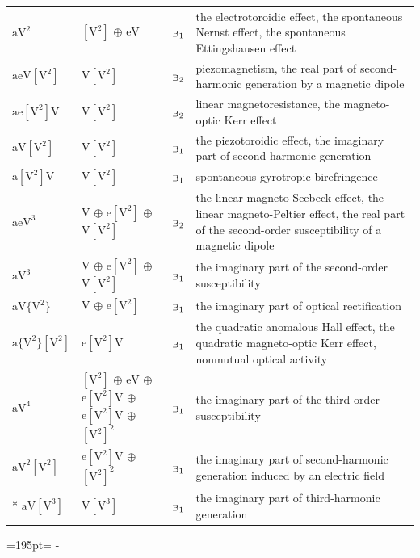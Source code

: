 \documentclass[10pt,a4paper]{article}
\newcommand{\needspace}[1]{\par\penalty-100\begingroup\dimen0=#1\relax\dimen2=\pagegoal
  \advance\dimen2-\pagetotal\ifdim\dimen0>\dimen2\relax\ifdim\dimen2>0pt\vfil\break\fi\fi
  \endgroup}
\numberwithin{equation}{section}
\newcommand{\irr}[1]{\text{\normalfont\scshape #1}}
\newcommand{\jahn}[1]{\mathrm{#1}}
\newlength{\fillwidth}\newlength{\cellwidth}\newlength{\colwidth}
\begin{document}
{\begin{longtable}{@{}lll>{\RaggedRight\arraybackslash}p{\fillwidth}@{}}
$\jahn{aV^{2}}$ & $\jahn{[V^{2}]}$ $\oplus$ $\jahn{eV}$ & $\irr{b}_{1}$ & the electrotoroidic effect, the spontaneous Nernst effect, the spontaneous Ettingshausen effect\\
$\jahn{aeV[V^{2}]}$ & $\jahn{V[V^{2}]}$ & $\irr{b}_{2}$ & piezomagnetism, the real part of second-harmonic generation by a magnetic dipole\\
$\jahn{ae[V^{2}]V}$ & $\jahn{V[V^{2}]}$ & $\irr{b}_{2}$ & linear magnetoresistance, the magneto-optic Kerr effect\\
$\jahn{aV[V^{2}]}$ & $\jahn{V[V^{2}]}$ & $\irr{b}_{1}$ & the piezotoroidic effect, the imaginary part of second-harmonic generation\\
$\jahn{a[V^{2}]V}$ & $\jahn{V[V^{2}]}$ & $\irr{b}_{1}$ & spontaneous gyrotropic birefringence\\
$\jahn{aeV^{3}}$ & $\jahn{V}$ $\oplus$ $\jahn{e[V^{2}]}$ $\oplus$ $\jahn{V[V^{2}]}$ & $\irr{b}_{2}$ & the linear magneto-Seebeck effect, the linear magneto-Peltier effect, the real part of the second-order susceptibility of a magnetic dipole\\
$\jahn{aV^{3}}$ & $\jahn{V}$ $\oplus$ $\jahn{e[V^{2}]}$ $\oplus$ $\jahn{V[V^{2}]}$ & $\irr{b}_{1}$ & the imaginary part of the second-order susceptibility\\
$\jahn{aV\{V^{2}\}}$ & $\jahn{V}$ $\oplus$ $\jahn{e[V^{2}]}$ & $\irr{b}_{1}$ & the imaginary part of optical rectification\\
$\jahn{a\{V^{2}\}[V^{2}]}$ & $\jahn{e[V^{2}]V}$ & $\irr{b}_{1}$ & the quadratic anomalous Hall effect, the quadratic magneto-optic Kerr effect, nonmutual optical activity\\
$\jahn{aV^{4}}$ & $\jahn{[V^{2}]}$ $\oplus$ $\jahn{eV}$ $\oplus$ $\jahn{e[V^{2}]V}$ $\oplus$ $\jahn{e[V^{2}]V}$ $\oplus$ $\jahn{[V^{2}]^{2}}$ & $\irr{b}_{1}$ & the imaginary part of the third-order susceptibility\\
$\jahn{aV^{2}[V^{2}]}$ & $\jahn{e[V^{2}]V}$ $\oplus$ $\jahn{[V^{2}]^{2}}$ & $\irr{b}_{1}$ & the imaginary part of second-harmonic generation induced by an electric field\\*
$\jahn{aV[V^{3}]}$ & $\jahn{V[V^{3}]}$ & $\irr{b}_{1}$ & the imaginary part of third-harmonic generation\\
\bottomrule\end{longtable}}
\needspace{195pt}
\end{document}
